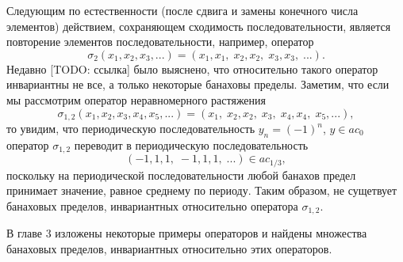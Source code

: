 Следующим по естественности (после сдвига и замены конечного числа элементов) действием, сохраняющем сходимость последовательности, является повторение элементов последовательности, например, оператор
\begin{equation}
	\sigma_2(x_1,x_2,x_3,...) = (x_1,x_1, \; x_2, x_2, \; x_3, x_3, \; ...)
	.
\end{equation}
Недавно [TODO: ссылка] было выяснено, что относительно такого оператор инвариантны не все, а только некоторые банаховы пределы.
Заметим, что если мы рассмотрим оператор неравномерного растяжения
\begin{equation}
	\sigma_{1,2}(x_1,x_2,x_3,x_4,x_5,...) = (x_1, \; x_2, x_2, \;  x_3, \; x_4, x_4, \; x_5, ...)
	,
\end{equation}
то увидим, что периодическую последовательность $y_n = (-1)^n$, $y\in ac_0$ оператор $\sigma_{1,2}$
переводит в периодическую последовательность
\begin{equation}
	(-1, 1, 1, \; -1, 1, 1, \; ...) \in ac_{1/3}
	,
\end{equation}
поскольку на периодической последовательности любой банахов предел принимает значение, равное среднему по периоду.
Таким образом, не сущетвует банаховых пределов, инвариантных относительно оператора $\sigma_{1,2}$.

В главе 3 изложены некоторые примеры операторов и найдены множества банаховых пределов,
инвариантных относительно этих операторов.
